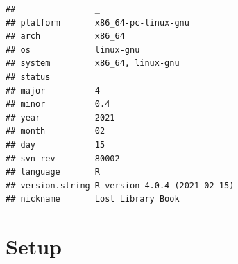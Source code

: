 \documentclass[]{book}
\begin{document}
\begin{verbatim}
##                _                           
## platform       x86_64-pc-linux-gnu         
## arch           x86_64                      
## os             linux-gnu                   
## system         x86_64, linux-gnu           
## status                                     
## major          4                           
## minor          0.4                         
## year           2021                        
## month          02                          
## day            15                          
## svn rev        80002                       
## language       R                           
## version.string R version 4.0.4 (2021-02-15)
## nickname       Lost Library Book
\end{verbatim}

\hypertarget{setup-4}{%
\section{Setup}\label{setup-4}}
\end{document}
